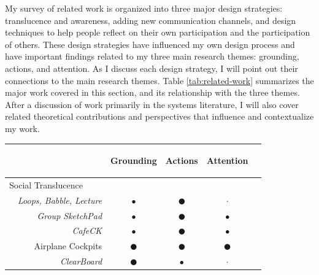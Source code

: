 My survey of related work is organized into three major design strategies: translucence and awareness, adding new communication channels, and design techniques to help people reflect on their own participation and the participation of others. These design strategies have influenced my own design process and have important findings related to my three main research themes: grounding, actions, and attention. As I discuss each design strategy, I will point out their connections to the main research themes. Table \ref{tab:related-work} summarizes the major work covered in this section, and its relationship with the three themes. After a discussion of work primarily in the systems literature, I will also cover related theoretical contributions and perspectives that influence and contextualize my work.

\begin{table}[p]

\begin{tabular}{lrcccl}

& & \begin{sideways}Grounding\end{sideways} & \begin{sideways}Actions\end{sideways} & \begin{sideways}Attention\end{sideways} \\
\midrule


\multicolumn{2}{l}{Social Translucence} & & & & \\
\midrule

& \emph{Loops, Babble, Lecture} &$\bullet$& $\CIRCLE$ & $\cdot$ & \citep{Erickson:2000kb} \\
& \emph{Group SketchPad} &$\bullet$& $\CIRCLE$ &$\bullet$& \citep{Gutwin:2002tf} \\
& \emph{CafeCK} &$\bullet$& $\CIRCLE$ &$\bullet$& \citep{Ackerman:1995tj} \\
& Airplane Cockpits & $\CIRCLE$ & $\CIRCLE$ & $\CIRCLE$ & \citep{Hutchins:1995ud} \\
& \emph{ClearBoard} & $\CIRCLE$ &$\bullet$& $\cdot$ & \citep{Ishii:1992bq} \\
\midrule



\end{tabular}
\end{table}

